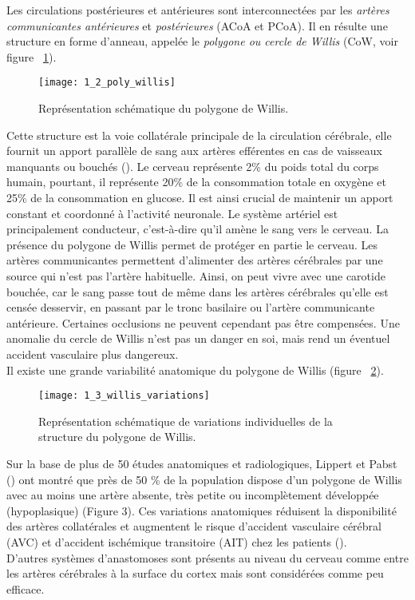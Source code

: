 Les circulations postérieures et antérieures sont interconnectées par les {\em artères communicantes antérieures} et {\em postérieures} (ACoA et PCoA). Il en résulte une structure en forme d’anneau, appelée le {\em polygone ou cercle de Willis} (CoW, voir figure ~\ref{fig:1_2_poly_willis}).
\begin{figure}[!t]
\centering
\texttt{[image: 1\_2\_poly\_willis]}
\caption{Représentation schématique du polygone de Willis. }
\label{fig:1_2_poly_willis}	
\end{figure}
Cette structure est la voie collatérale principale de la circulation cérébrale, elle fournit un apport parallèle de sang aux artères efférentes en cas de vaisseaux manquants ou bouchés (\cite{Alastruey2007}). Le cerveau représente 2\% du poids total du corps humain, pourtant, il représente 20\% de la consommation totale en oxygène et 25\% de la consommation en glucose. Il est ainsi crucial de maintenir un apport constant et coordonné à l’activité neuronale. Le système artériel est principalement conducteur, c’est-à-dire qu’il amène le sang vers le cerveau. La présence du polygone de Willis permet de protéger en partie le cerveau. Les artères communicantes permettent d'alimenter des artères cérébrales par une source qui n'est pas l'artère habituelle. Ainsi, on peut vivre avec une carotide bouchée, car le sang passe tout de même dans les artères cérébrales qu'elle est censée desservir, en passant par le tronc basilaire ou l'artère communicante antérieure. Certaines occlusions ne peuvent cependant pas être compensées. Une anomalie du cercle de Willis n'est pas un danger en soi, mais rend un éventuel accident vasculaire plus dangereux.\\
Il existe une grande variabilité anatomique du polygone de Willis (figure ~\ref{fig:1_3_willis_variations}). 
\begin{figure}[!t]
\centering
\texttt{[image: 1\_3\_willis\_variations]}
\caption{Représentation schématique de variations individuelles de la structure du polygone de Willis. }
\label{fig:1_3_willis_variations}	
\end{figure}
Sur la base de plus de 50 études anatomiques et radiologiques, Lippert et Pabst (\cite{LippertPabst1985}) ont montré que près de 50 \% de la population dispose d’un polygone de Willis avec au moins une artère absente, très petite ou incomplètement développée (hypoplasique) (Figure 3). Ces variations anatomiques réduisent la disponibilité des artères collatérales et augmentent le risque d’accident vasculaire cérébral (AVC) et d’accident ischémique transitoire (AIT) chez les patients (\cite{Henderson2000}).\\
D’autres systèmes d’anastomoses sont présents au niveau du cerveau comme entre les artères cérébrales à la surface du cortex mais sont considérées comme peu efficace.\\
